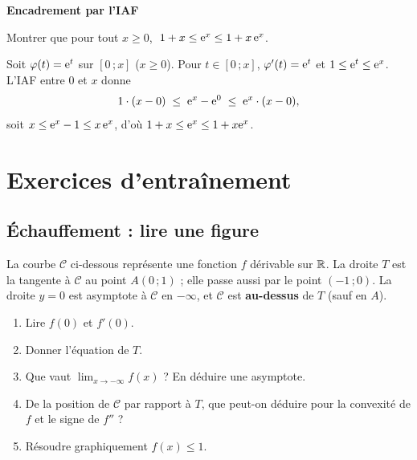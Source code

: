 \bigskip
\exerciceresolu
\textbf{Encadrement par l'IAF}

Montrer que pour tout $x\geq 0$, $\;1+x\leq \mathrm{e}^{x}\leq 1+x\,\mathrm{e}^{x}$.

\solution

Soit $\varphi(t)=\mathrm{e}^{t}$ sur $[0\,;x]$ ($x\geq 0$). Pour $t\in[0\,;x]$,
$\varphi'(t)=\mathrm{e}^{t}$ et $1\leq \mathrm{e}^{t}\leq \mathrm{e}^{x}$. L'IAF entre $0$ et $x$
donne
\[
1\cdot(x-0)\;\leq\; \mathrm{e}^{x}-\mathrm{e}^{0}\;\leq\; \mathrm{e}^{x}\cdot(x-0),
\]
soit $x\leq \mathrm{e}^{x}-1\leq x\,\mathrm{e}^{x}$, d'où $1+x\leq \mathrm{e}^{x}\leq 1+x\mathrm{e}^{x}$.


\section{Exercices d'entraînement}

\subsection{Échauffement : lire une figure}

La courbe $\mathcal C$ ci-dessous représente une fonction $f$ dérivable sur
$\mathbb{R}$. La droite $T$ est la tangente à $\mathcal C$ au point $A(0\,;1)$ ; elle
passe aussi par le point $(-1\,;0)$. La droite $y=0$ est asymptote à
$\mathcal C$ en $-\infty$, et $\mathcal C$ est \textbf{au-dessus} de $T$
(sauf en $A$).

\begin{center}
\end{center}

\begin{enumerate}
	\item Lire $f(0)$ et $f'(0)$.
	\item Donner l'équation de $T$.
	\item Que vaut $\displaystyle\lim_{x\to-\infty}f(x)$ ? En déduire une
	asymptote.
	\item De la position de $\mathcal C$ par rapport à $T$, que peut-on
	déduire pour la convexité de $f$ et le signe de $f''$ ?
	\item Résoudre graphiquement $f(x)\leq 1$.
\end{enumerate}

